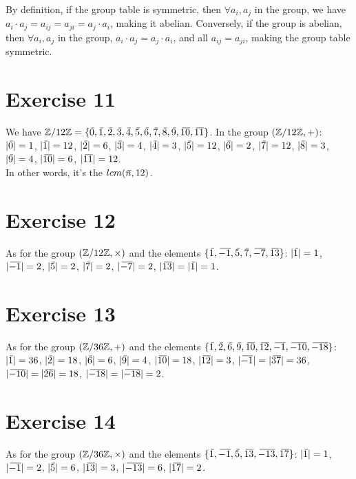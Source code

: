 \documentclass[12pt]{article}
\begin{document}
    By definition, if the group table is symmetric,
    then $\forall a_i, a_j$ in the group,
    we have $a_i \cdot a_j = a_{ij} = a_{ji} = a_j \cdot a_i$,
    making it abelian.
    Conversely, if the group is abelian,
    then $\forall a_i, a_j$ in the group, $a_i \cdot a_j = a_j \cdot a_i$,
    and all $a_{ij} = a_{ji}$,
    making the group table symmetric.


    \section*{Exercise 11}
    We have $\Z/12\Z = \{\olsi{0},\olsi{1}, \olsi{2}, \olsi{3}, \olsi{4},
    \olsi{5}, \olsi{6}, \olsi{7}, \olsi{8}, \olsi{9}, \olsi{10}, \olsi{11}\}$.
    In the group $(\mathbb{Z}/12\mathbb{Z}, +)$:
    $|\,\overline{\!{0}}| = 1$,
    $|\,\overline{\!{1}}| = 12$,
    $|\,\overline{\!{2}}| = 6$,
    $|\,\overline{\!{3}}| = 4$,
    $|\,\overline{\!{4}}| = 3$, 
    $|\,\overline{\!{5}}| = 12$,
    $|\,\overline{\!{6}}| = 2$,
    $|\,\overline{\!{7}}| = 12$,
    $|\,\overline{\!{8}}| = 3$,
    $|\,\overline{\!{9}}| = 4$, 
    $|\,\overline{\!{10}}| = 6$,
    $|\,\overline{\!{11}}| = 12$. \\
    In other words, it's the $lcm(\,\overline{\!{n}}, 12)$.


    \section*{Exercise 12}
    As for the group $(\mathbb{Z}/12\mathbb{Z}, \times)$
    and the elements $\{\,\overline{\!{1}}, \,\overline{\!{-1}}, \,\overline{\!{5}}, \,\overline{\!{7}}, \,\overline{\!{-7}},
    \,\overline{\!{13}}\}$:
    $|\,\overline{\!{1}}| = 1$,
    $|\,\overline{\!{-1}}| = 2$,
    $|\,\overline{\!{5}}| = 2$,
    $|\,\overline{\!{7}}| = 2$,
    $|\,\overline{\!{-7}}| = 2$, 
    $|\,\overline{\!{13}}| = |\,\overline{\!{1}}| = 1$.


    \section*{Exercise 13}
    As for the group $(\mathbb{Z}/36\mathbb{Z}, +)$
    and the elements $\{\olsi{1}, \olsi{2}, \olsi{6}, \olsi{9}, \olsi{10},
    \olsi{12}, \olsi{-1}, \olsi{-10}, \olsi{-18}\}$:
    $|\,\overline{\!{1}}| = 36$,
    $|\,\overline{\!{2}}| = 18$,
    $|\,\overline{\!{6}}| = 6$,
    $|\,\overline{\!{9}}| = 4$,
    $|\,\overline{\!{10}}| = 18$, 
    $|\,\overline{\!{12}}| = 3$,
    $|\,\overline{\!{-1}}| = |\,\overline{\!{37}}| = 36$,
    $|\,\overline{\!{-10}}| = |\,\overline{\!{26}}| = 18$,
    $|\,\overline{\!{-18}}| = |\,\overline{\!{-18}}| = 2$.



    \section*{Exercise 14}
    As for the group $(\mathbb{Z}/36\mathbb{Z}, \times)$
    and the elements $\{\,\overline{\!{1}}, \,\overline{\!{-1}}, \,\overline{\!{5}}, \,\overline{\!{13}}, \,\overline{\!{-13}},
    \,\overline{\!{17}}\}$:
    $|\,\overline{\!{1}}| = 1$,
    $|\,\overline{\!{-1}}| = 2$,
    $|\,\overline{\!{5}}| = 6$,
    $|\,\overline{\!{13}}| = 3$,
    $|\,\overline{\!{-13}}| = 6$, 
    $|\,\overline{\!{17}}| = 2$.
\end{document}
